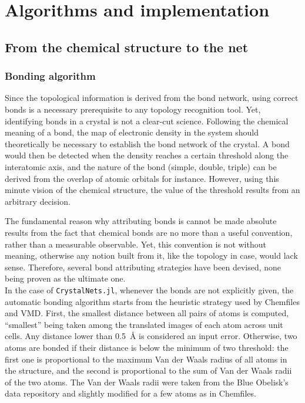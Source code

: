 \documentclass[main.tex]{subfiles}
\begin{document}
\section{Algorithms and implementation}

\subsection{From the chemical structure to the net}

\subsubsection{Bonding algorithm}
\label{bondingalgorithm}

Since the topological information is derived from the bond network, using correct bonds is a necessary prerequisite to any topology recognition tool. Yet, identifying bonds in a crystal is not a clear-cut science. %
Following the chemical meaning of a bond, the map of electronic density in the system should theoretically be necessary to establish the bond network of the crystal. A bond would then be detected when the density reaches a certain threshold along the interatomic axis, and the nature of the bond (simple, double, triple) can be derived from the overlap of atomic orbitals for instance. However, using this minute vision of the chemical structure, the value of the threshold results from an arbitrary decision.

The fundamental reason why attributing bonds is cannot be made absolute results from the fact that chemical bonds are no more than a useful convention, rather than a measurable observable. Yet, this convention is not without meaning, otherwise any notion built from it, like the topology in case, would lack sense. Therefore, several bond attributing strategies have been devised, none being proven as the ultimate one. %
\\

In the case of \texttt{CrystalNets.jl}, whenever the bonds are not explicitly given, the automatic bonding algorithm starts from the heuristic strategy used by Chemfiles and VMD\autocite{VMD}. First, the smallest distance between all pairs of atoms is computed, ``smallest'' being taken among the translated images of each atom across unit cells. Any distance lower than \qty{0.5}{\angstrom} is considered an input error. Otherwise, two atoms are bonded if their distance is below the minimum of two threshold: the first one is proportional to the maximum Van der Waals radius of all atoms in the structure, and the second is proportional to the sum of Van der Waals radii of the two atoms. The Van der Waals radii were taken from the Blue Obelisk's data repository and slightly modified for a few atoms as in Chemfiles.
\end{document}
